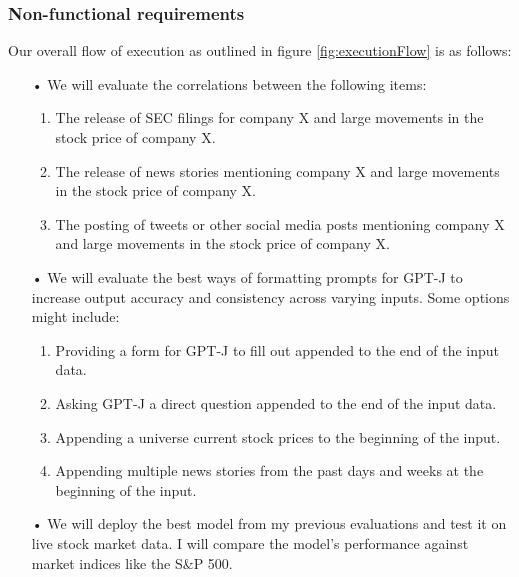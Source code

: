 \documentclass[conference]{IEEEtran}
\begin{document}
\subsubsection{Non-functional requirements}
Our overall flow of execution as outlined in figure \ref{fig:executionFlow} is as follows:
\begin{enumerate}
    \item[•] We will evaluate the correlations between the following items:
    \begin{enumerate}
        \item The release of SEC filings for company X and large movements in the stock price of company X.
        \item The release of news stories mentioning company X and large movements in the stock price of company X.
        \item The posting of tweets or other social media posts mentioning company X and large movements in the stock price of company X.
    \end{enumerate}
    \item[•] We will evaluate the best ways of formatting prompts for GPT-J to increase output accuracy and consistency across varying inputs. Some options might include:
    \begin{enumerate}
        \item Providing a form for GPT-J to fill out appended to the end of the input data.
        \item Asking GPT-J a direct question appended to the end of the input data.
        \item Appending a universe current stock prices to the beginning of the input.
        \item Appending multiple news stories from the past days and weeks at the beginning of the input.
    \end{enumerate}
    \item[•] We will deploy the best model from my previous evaluations and test it on live stock market data. I will compare the model's performance against market indices like the S\&P 500. 
\end{enumerate}
\end{document}
